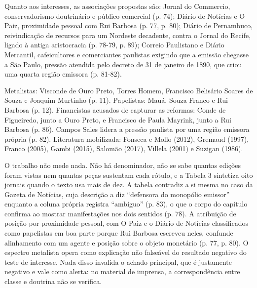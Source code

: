 Quanto aos interesses, as associações propostas são: Jornal do Commercio,
conservadorismo doutrinário e público comercial (p. 74); Diário de Notícias e
O Paiz, proximidade pessoal com Rui Barbosa (p. 77, p. 80); Diário de
Pernambuco, reivindicação de recursos para um Nordeste decadente, contra o
Jornal do Recife, ligado à antiga aristocracia (p. 78-79, p. 89); Correio
Paulistano e Diário Mercantil, cafeicultores e comerciantes paulistas exigindo
que a emissão chegasse a São Paulo, pressão atendida pelo decreto de 31 de
janeiro de 1890, que criou uma quarta região emissora (p. 81-82).

Metalistas: Visconde de Ouro Preto, Torres Homem, Francisco Belisário Soares
de Souza e Joaquim Murtinho (p. 11). Papelistas: Mauá, Souza Franco e Rui
Barbosa (p. 12). Financistas acusados de capturar as reformas: Conde de
Figueiredo, junto a Ouro Preto, e Francisco de Paula Mayrink, junto a Rui
Barbosa (p. 86). Campos Sales lidera a pressão paulista por uma região
emissora própria (p. 82). Literatura mobilizada: Fonseca e Mollo (2012),
Gremaud (1997), Franco (2005), Gambi (2015), Salomão (2017), Villela (2001) e
Suzigan (1986).

O trabalho não mede nada. Não há denominador, não se sabe quantas edições
foram vistas nem quantas peças sustentam cada rótulo, e a Tabela 3 sintetiza
oito jornais quando o texto usa mais de dez. A tabela contradiz a si mesma no
caso da Gazeta de Notícias, cuja descrição a diz ``defensora do monopólio
emissor'' enquanto a coluna própria registra ``ambíguo'' (p. 83), o que o
corpo do capítulo confirma ao mostrar manifestações nos dois sentidos (p. 78).
A atribuição de posição por proximidade pessoal, com O Paiz e o Diário de
Notícias classificados como papelistas em boa parte porque Rui Barbosa
escreveu neles, confunde alinhamento com um agente e posição sobre o objeto
monetário (p. 77, p. 80). O espectro metalista opera como explicação não
falseável do resultado negativo do teste de interesse. Nada disso invalida o
achado principal, que é justamente negativo e vale como alerta: no material de
imprensa, a correspondência entre classe e doutrina não se verifica.


